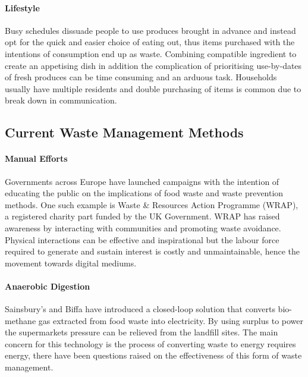 \documentclass[a4paper, 11pt]{article}
\begin{document}
\paragraph{Lifestyle} Busy schedules dissuade people to use produces brought in advance and instead opt for the quick and easier choice of eating out, thus items purchased with the intentions of consumption end up as waste.\cite{motivation} Combining compatible ingredient to create an appetising dish in addition the complication of prioritising use-by-dates of fresh produces can be time consuming and an arduous task. Households usually have multiple residents and double purchasing of items is common due to break down in communication.

\vspace{\baselineskip}
\vspace{\baselineskip}
\vspace{\baselineskip}

\subsection{Current Waste Management Methods}

\paragraph{Manual Efforts}
Governments across Europe have launched campaigns with the intention of educating the public on the implications of food waste and waste prevention methods. One such example is Waste \& Resources Action Programme (WRAP), a registered charity part funded by the UK Government. WRAP has raised awareness by interacting with communities and promoting waste avoidance. Physical interactions can be effective and inspirational but the labour force required to generate and sustain interest is costly and unmaintainable, hence the movement towards digital mediums.\cite{FoodWaste}

\paragraph{Anaerobic Digestion}
Sainsbury's and Biffa have introduced a closed-loop solution that converts bio-methane gas extracted from food waste into electricity. By using surplus to power the supermarkets pressure can be relieved from the landfill sites. The main concern for this technology is the process of converting waste to energy requires energy, there have been questions raised on the effectiveness of this form of waste management.\cite{anarobic} 
\end{document}
